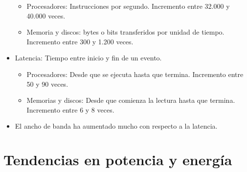 \documentclass[12pt, twoside, openright]{report} %
\begin{document}
\begin{itemize}
    \begin{itemize}
    
    \item
      Procesadores: Instrucciones por segundo. Incremento entre 32.000 y
      40.000 veces.
    \item
      Memoria y discos: bytes o bits transferidos por unidad de tiempo.
      Incremento entre 300 y 1.200 veces.
    \end{itemize}
  \item
    Latencia: Tiempo entre inicio y fin de un evento.

    \begin{itemize}
    
    \item
      Procesadores: Desde que se ejecuta hasta que termina. Incremento
      entre 50 y 90 veces.
    \item
      Memorias y discos: Desde que comienza la lectura hasta que
      termina. Incremento entre 6 y 8 veces.
    \end{itemize}
  \item
    El ancho de banda ha aumentado mucho con respecto a la latencia.

  \end{itemize}
  \section{Tendencias en potencia y energía}
\end{document}
